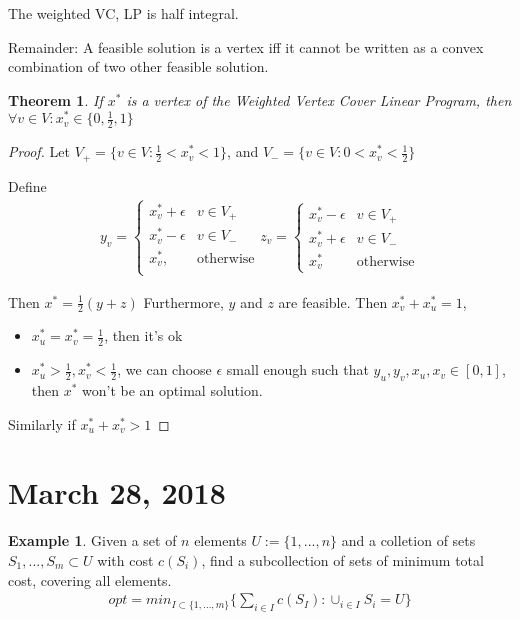 \documentclass{article}
\theoremstyle{plain}
\newtheorem{thm}{Theorem}
\theoremstyle{definition}
\newtheorem{eg}{Example}
\begin{document}
The weighted VC, LP is half integral.

Remainder: A feasible solution is a vertex iff it cannot be written as a convex
combination of two other feasible solution.

\begin{thm}
    If $x^*$ is a vertex of the Weighted Vertex Cover Linear Program,
    then $\forall v\in V: x^*_v\in\{0,\frac{1}{2},1\}$
\end{thm}

\begin{proof}
    Let $V_+ = \{v\in V: \frac{1}{2} < x^*_v < 1\}$, and
    $V_- = \{v\in V: 0 < x^*_v < \frac{1}{2}\}$

    Define
    \begin{align*}
        y_v =
        \begin{cases}
            x^*_v + \epsilon & v\in V_+\\
            x^*_v - \epsilon & v\in V_-\\
            x^*_v, & \text{otherwise}\\
        \end{cases}
        z_v =
        \begin{cases}
            x^*_v - \epsilon & v\in V_+\\
            x^*_v + \epsilon & v\in V_-\\
            x^*_v & \text{otherwise}
        \end{cases}
    \end{align*}

    Then $x^* = \frac{1}{2}(y+z)$
    Furthermore, $y$ and $z$ are feasible. Then $x^*_v + x^*_u = 1$,
    \begin{itemize}
        \item $x^*_u = x^*_v = \frac{1}{2}$, then it's ok
        \item $x^*_u > \frac{1}{2}, x^*_v < \frac{1}{2}$, we can choose $\epsilon$ small
            enough such that $y_u, y_v, x_u, x_v\in [0, 1]$, then $x^*$ won't be
            an optimal solution.
    \end{itemize}
    Similarly if $x^*_u + x^*_v > 1$
\end{proof}

\section{March 28, 2018}
\begin{eg}
    Given a set of $n$ elements $U := \{1, ..., n\}$ and a colletion of sets
    $S_1, ..., S_m\subset U$ with cost $c(S_i)$, find a subcollection of sets
    of minimum total cost, covering all elements.
    \begin{align*}
        opt = min_{I\subset\{1, ...,m\}}\{\sum_{i\in I} c(S_I): \cup_{i\in I}S_i = U\}
    \end{align*}
\end{eg}
\end{document}
